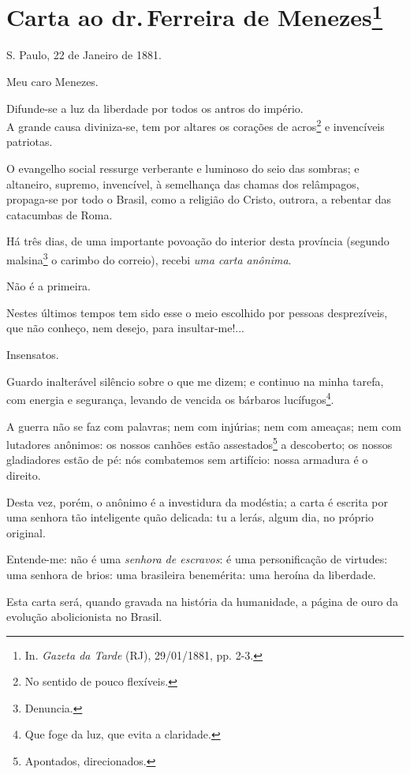 \chapter{Carta ao dr.\,Ferreira de Menezes\footnote[*]{In.
  \emph{Gazeta da Tarde} (RJ), 29/01/1881, pp. 2-3.}}

S. Paulo, 22 de Janeiro de 1881.

Meu caro Menezes.

Difunde-se a luz da liberdade por todos os antros do império.\\
A grande causa diviniza-se, tem por altares os corações de
acros\footnote{No sentido de pouco flexíveis.} e invencíveis
patriotas.

O evangelho social ressurge verberante e luminoso do seio das sombras; e
altaneiro, supremo, invencível, à semelhança das chamas dos relâmpagos,
propaga-se por todo o Brasil, como a religião do Cristo, outrora, a
rebentar das catacumbas de Roma.

Há três dias, de uma importante povoação do interior desta província
(segundo malsina\footnote{Denuncia.} o carimbo do correio), recebi
\emph{uma carta anônima}.

Não é a primeira.

Nestes últimos tempos tem sido esse o meio escolhido por pessoas
desprezíveis, que não conheço, nem desejo, para insultar-me!...

Insensatos.

Guardo inalterável silêncio sobre o que me dizem; e continuo na minha
tarefa, com energia e segurança, levando de vencida os bárbaros
lucífugos\footnote{Que foge da luz, que evita a claridade.}.

A guerra não se faz com palavras; nem com injúrias; nem com ameaças; nem
com lutadores anônimos: os nossos canhões estão assestados\footnote{
  Apontados, direcionados.} a descoberto; os nossos gladiadores estão de
pé: nós combatemos sem artifício: nossa armadura é o direito.

Desta vez, porém, o anônimo é a investidura da modéstia; a carta é
escrita por uma senhora tão inteligente quão delicada: tu a lerás, algum
dia, no próprio original.

Entende-me: não é uma \emph{senhora de escravos}: é uma personificação
de virtudes: uma senhora de brios: uma brasileira benemérita: uma
heroína da liberdade.

Esta carta será, quando gravada na história da humanidade, a página de
ouro da evolução abolicionista no Brasil.

